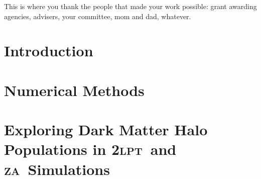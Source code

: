 \documentclass[12pt]{report}
\newcommand{\lpt}{\textsc{2lpt}}
\newcommand{\za}{\textsc{za}}
\begin{document}
This is where you thank the people that made your work possible: grant awarding agencies, advisers, your committee, mom and dad, whatever.


\singlespacing
\tableofcontents

\begingroup
\setlength{\parskip}{1\baselineskip}
\listoftables
\newpage
\listoffigures
\newpage
\printnomenclature
\newpage
\endgroup

\normalsize
\doublespacing
{}
\setcounter{page}{1}


\chapter{Introduction}
\label{chap:introduction}






\chapter{Numerical Methods}
\label{chap:methods}










\chapter{Exploring Dark Matter Halo Populations in \lpt\ and \za\ Simulations}
\label{chap:2lpt}







\end{document}
